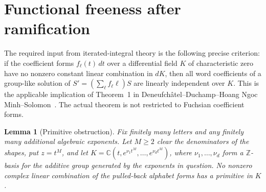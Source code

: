 \documentclass[11pt,a4paper]{article}
\newtheorem{lemma}[theorem]{Lemma}
\theoremstyle{definition}
\theoremstyle{remark}
\numberwithin{equation}{section}
\begin{document}
\section{Functional freeness after ramification}
The required input from iterated-integral theory is the following precise
criterion: if the coefficient forms $f_\ell(t)\,dt$ over a differential
field $K$ of characteristic zero have no nonzero constant linear
combination in $dK$, then all word coefficients of a group-like solution
of $S'=(\sum_\ell f_\ell\ell)S$ are linearly independent over $K$.
This is the applicable implication of Theorem~1 in
Deneufch\^atel--Duchamp--Hoang Ngoc Minh--Solomon~\cite{DDS}. The actual theorem is not restricted to
Fuchsian coefficient forms.

\begin{lemma}[Primitive obstruction]\label{core:lem:primitive}
Fix finitely many letters and any finitely many additional algebraic
exponents. Let $M\ge2$ clear the denominators of the shapes, put $z=t^M$,
and let $K=\mathbb C(t,e^{\nu_1t^M},\ldots,e^{\nu_dt^M})$, where
$\nu_1,\ldots,\nu_d$ form a $\mathbb Z$-basis for the additive group
generated by the exponents in question. No nonzero complex linear
combination of the pulled-back alphabet forms has a primitive in $K$.
\end{lemma}
\end{document}
